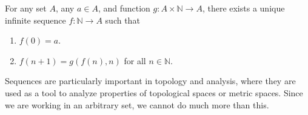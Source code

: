   \begin{theorem}
    For any set $A$, any $a \in A$, and function $g: A \times \mathbb{N} \to A$, there exists a unique infinite sequence $f: \mathbb{N} \to A$ such that 
    \begin{enumerate}
      \item $f(0) = a$. 
      \item $f(n+1) = g(f(n), n)$ for all $n \in \mathbb{N}$. 
    \end{enumerate}
  \end{theorem}

  Sequences are particularly important in topology and analysis, where they are used as a tool to analyze properties of topological spaces or metric spaces. Since we are working in an arbitrary set, we cannot do much more than this.   

